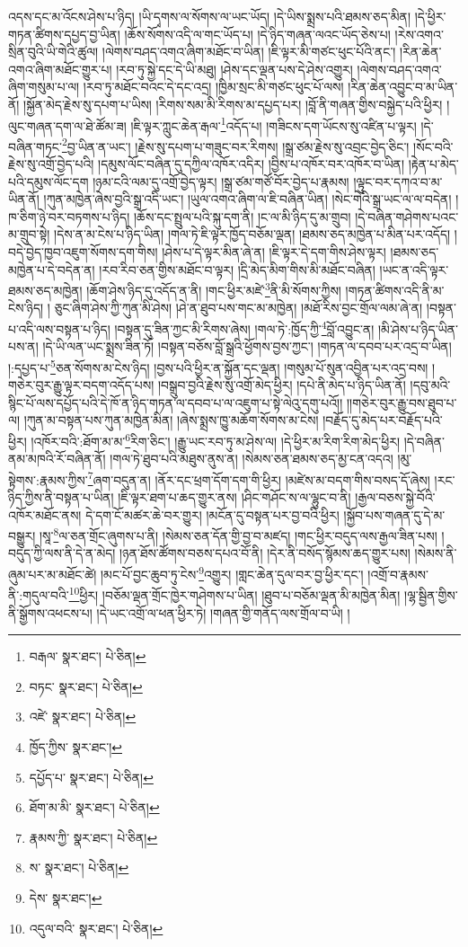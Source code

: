འདས་དང་མ་འོངས་ཤེས་པ་ཉིད། །ཡི་དྭགས་ལ་སོགས་ལ་ཡང་ཡོད། །དེ་ཡིས་སྨྲས་པའི་ཐམས་ཅད་མིན། །དེ་ཕྱིར་གཏན་ཚིགས་དཔྱད་བྱ་ཡིན། །ཆོས་སོགས་འདི་ལ་གང་ཡོད་པ། །དེ་ཉིད་གཞན་ལའང་ཡོད་ཅེས་པ། །རེས་འགའ་སྲིན་བུའི་ཡི་གེའི་ཚུལ། །ལེགས་བཤད་འགའ་ཞིག་མཐོང་བ་ཡིན། །ཇི་ལྟར་མི་གཙང་ཕུང་པོའི་ནང་། །རིན་ཆེན་འགའ་ཞིག་མཐོང་གྱུར་པ། །རབ་ཏུ་སྐྱེ་དང་དེ་ཡི་མཐུ། །ཤེས་དང་ལྡན་པས་དེ་ཤེས་འགྱུར། །ལེགས་བཤད་འགའ་ཞིག་གསུམ་པ་ལ། །རབ་ཏུ་མཐོང་བའང་དེ་དང་འདྲ། །ཁྱིམ་སྲང་མི་གཙང་ཕུང་པོ་ལས། །རིན་ཆེན་འབྱུང་བ་མ་ཡིན་ནོ། །སྐྱོན་མེད་རྗེས་སུ་དཔག་པ་ཡིས། །རིགས་སམ་མི་རིགས་མ་དཔྱད་པར། །བློ་ནི་གཞན་གྱིས་བསྐྱེད་པའི་ཕྱིར། །ལུང་གཞན་དག་ལ་ཐེ་ཚོམ་ཟ། །ཇི་ལྟར་ཀླུང་ཆེན་རྒལ་\footnote{བརྒལ་  སྣར་ཐང་།  པེ་ཅིན། }འདོད་པ། །གཟིངས་དག་ཡོངས་སུ་འཛིན་པ་ལྟར། །དེ་བཞིན་གཏང་\footnote{བཏང་  སྣར་ཐང་།  པེ་ཅིན། }བྱ་ཡིན་ན་ཡང་། །རྗེས་སུ་དཔག་པ་གཟུང་བར་རིགས། །སྒྲ་ཙམ་རྗེས་སུ་འབྲང་བྱེད་ཅིང་། །སོང་བའི་རྗེས་སུ་འགྲོ་བྱེད་པའི། །དམུས་ལོང་བཞིན་དུ་དཀྱིལ་འཁོར་འདིར། །བྱིས་པ་འཁོར་བར་འཁོར་བ་ཡིན། །རྟེན་པ་མེད་པའི་དམུས་ལོང་དག །ཉམ་ངའི་ལམ་དུ་འགྲོ་བྱེད་ལྟར། །སྒྲ་ཙམ་གཙོ་བོར་བྱེད་པ་རྣམས། །ལྟུང་བར་དཀའ་བ་མ་ཡིན་ནོ། །ཀུན་མཁྱེན་ཞེས་བྱའི་སྒྲ་འདི་ཡང་། །ཡུལ་འགའ་ཞིག་ལ་ཇི་བཞིན་ཡིན། །སེང་གེའི་སྒྲ་ཡང་ལ་ལ་བདེན། །ཁ་ཅིག་ཉེ་བར་བཏགས་པ་ཉིད། །ཆོས་དང་སྤྲུལ་པའི་སྐུ་དག་ནི། །ང་ལ་མི་ཉིད་དུ་མ་གྲུབ། །དེ་བཞིན་གཤེགས་པའང་མ་གྲུབ་སྟེ། །དེས་ན་མ་ངེས་པ་ཉིད་ཡིན། །གལ་ཏེ་ཇི་ལྟར་ཁྱོད་བཅོམ་ལྡན། །ཐམས་ཅད་མཁྱེན་པ་མིན་པར་འདོད། །བདེ་བྱེད་ཁྱབ་འཇུག་སོགས་དག་གིས། །ཤེས་པ་དེ་ལྟར་མིན་ཞེ་ན། །ཇི་ལྟར་དེ་དག་གིས་ཤེས་ལྟར། །ཐམས་ཅད་མཁྱེན་པ་དེ་བདེན་ན། །རབ་རིབ་ཅན་གྱིས་མཐོང་བ་ལྟར། །དྲི་མེད་མིག་གིས་མི་མཐོང་བཞིན། །ཡང་ན་འདི་ལྟར་ཐམས་ཅད་མཁྱེན། །ཆོག་ཤེས་ཉིད་དུ་འདོད་ན་ནི། །གང་ཕྱིར་མཛེ་\footnote{འཛེ་  སྣར་ཐང་།  པེ་ཅིན། }ནི་མི་སོགས་ཀྱིས། །གཏན་ཚིགས་འདི་ནི་མ་ངེས་ཉིད། །
ཅུང་ཞིག་ཤེས་ཀྱི་ཀུན་མི་ཤེས། །ཤེ་ན་ཐུབ་པས་གང་མ་མཁྱེན། །མཐོ་རིས་བྱང་གྲོལ་ལམ་ཞེ་ན། །བསྟན་པ་འདི་ལས་བསྟན་པ་ཉིད། །བསྟན་དུ་ཟིན་ཀྱང་མི་རིགས་ཞེས། །གལ་ཏེ་:ཁྱོད་ཀྱི་\footnote{ཁྱོད་ཀྱིས་  སྣར་ཐང་། }བློ་འབྱུང་ན། །མི་ཤེས་པ་ཉིད་ཡིན་པས་ན། །དེ་ཡི་ལན་ཡང་སྨྲས་ཟིན་ཏོ། །བསྟན་བཅོས་བློ་སྒྲའི་ཕྱོགས་བྱས་ཀྱང་། །གཏན་ལ་དབབ་པར་འདྲ་བ་ཡིན། །:དཔྱད་པ་\footnote{དཔྱོད་པ་  སྣར་ཐང་།  པེ་ཅིན། }ཅན་སོགས་མ་ངེས་ཉིད། །བྱས་པའི་ཕྱིར་ན་སྐྱོན་དང་ལྡན། །གསུམ་པོ་སུན་འབྱིན་པར་འདྲ་བས། །གཅེར་བུར་རྒྱུ་ལྟར་བདག་འདོད་པས། །བསྒྲུབ་བྱའི་རྗེས་སུ་འགྲོ་མེད་ཕྱིར། །དཔེ་ནི་མེད་པ་ཉིད་ཡིན་ནོ། །དབུ་མའི་སྙིང་པོ་ལས་དཔྱོད་པའི་དེ་ཁོ་ན་ཉིད་གཏན་ལ་དབབ་པ་ལ་འཇུག་པ་སྟེ་ལེའུ་དགུ་པའོ།། །།གཅེར་བུར་རྒྱུ་བས་ཐུབ་པ་ལ། །ཀུན་མ་བསྟན་པས་ཀུན་མཁྱེན་མིན། །ཞེས་སྨྲས་ཁྱུ་མཆོག་སོགས་མ་ངེས། །བརྗོད་དུ་མེད་པར་བརྗོད་པའི་ཕྱིར། །འཁོར་བའི་:ཐོག་མ་མ་\footnote{ཐོག་མ་མི་  སྣར་ཐང་།  པེ་ཅིན། }རིག་ཅིང་། །རྒྱུ་ཡང་རབ་ཏུ་མ་ཤེས་ལ། །དེ་ཕྱིར་མ་རིག་རིག་མེད་ཕྱིར། །དེ་བཞིན་ནམ་མཁའི་རོ་བཞིན་ནོ། །གལ་ཏེ་ཐུབ་པའི་མཐུས་ནུས་ན། །སེམས་ཅན་ཐམས་ཅད་མྱ་ངན་འདའ། །མུ་སྟེགས་:རྣམས་ཀྱིས་\footnote{རྣམས་ཀྱི་  སྣར་ཐང་།  པེ་ཅིན། }ཞག་བདུན་ན། །ནོར་དང་ཕྲག་དོག་དག་གི་ཕྱིར། །མཛེས་མ་བདག་གིས་བསད་དོ་ཞེས། །རང་ཉིད་ཀྱིས་ནི་བསྟན་པ་ཡིན། །ཇི་ལྟར་ཐག་པ་ཆད་གྱུར་ནས། །ཤིང་གཤོང་ས་ལ་ལྷུང་བ་ནི། །རྒྱལ་བཅས་སྐྱེ་བོའི་འཁོར་མཐོང་ནས། དེ་དག་ངོ་མཚར་ཆེ་བར་གྱུར། །མངོན་དུ་བསྟན་པར་བྱ་བའི་ཕྱིར། །སྐྱོབ་པས་གཞན་དུ་དེ་མ་བསྒྱུར། །སཱ་\footnote{ས་  སྣར་ཐང་།  པེ་ཅིན། }ལ་ཅན་གྲོང་ཞུགས་པ་ནི། །སེམས་ཅན་དོན་གྱི་བྱ་བ་མཛད། །གང་ཕྱིར་བདུད་ལས་རྒྱལ་ཟིན་པས། །བདུད་ཀྱི་ལས་ནི་དེ་ན་མེད། །ཉན་ཐོས་ཚོགས་བཅས་དཔའ་བོ་ནི། །དེར་ནི་བསོད་སྙོམས་ཆད་གྱུར་པས། །སེམས་ནི་ཞུམ་པར་མ་མཐོང་ཚེ། །མང་པོ་བྱང་ཆུབ་ཏུ་ངེས་\footnote{དེས་  སྣར་ཐང་། }འགྱུར། །གླང་ཆེན་དུལ་བར་བྱ་ཕྱིར་དང་། །འགྲོ་བ་རྣམས་ནི་:གདུལ་བའི་\footnote{འདུལ་བའི་  སྣར་ཐང་།  པེ་ཅིན། }ཕྱིར། །བཅོམ་ལྡན་གྲོང་ཁྱེར་གཤེགས་པ་ཡིན། །ཐུབ་པ་བཅོམ་ལྡན་མི་མཁྱེན་མིན། །ལྷ་སྦྱིན་གྱིས་ནི་སྒྱོགས་འཕངས་པ། །དེ་ཡང་འགྲོ་ལ་ཕན་ཕྱིར་ཏེ། །གཞན་གྱི་གནོད་ལས་གྲོལ་བ་ཡི། །
